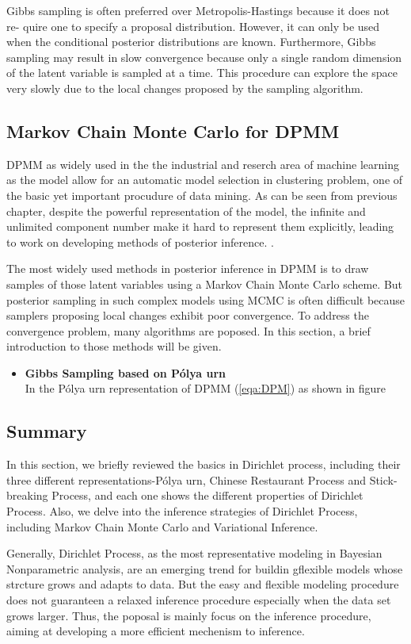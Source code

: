 \begin{itemize}
		 Gibbs sampling is often preferred over Metropolis-Hastings because it does not re-
		 quire one to specify a proposal distribution. However, it can only be used when the
		 conditional posterior distributions are known. Furthermore, Gibbs sampling may result in slow convergence because only a single random dimension of the latent variable is sampled at a time. This procedure can explore the space very slowly due to the local changes proposed by the sampling algorithm.
		 
	\end{itemize}
	
	\subsection{Markov Chain Monte Carlo for DPMM}
	 DPMM as widely used in the the industrial and reserch area of machine learning as the model allow for an automatic model selection in clustering problem, one of the basic yet important procudure of data mining. As can be seen from previous chapter, despite the powerful representation of the model, the infinite and unlimited component number make it hard to represent them explicitly, leading to work on developing methods of posterior inference. . 
	 
	 The most widely used methods in posterior inference in DPMM is to draw samples of those latent variables using a Markov Chain Monte Carlo scheme. But posterior sampling in such complex models using MCMC is often difficult because samplers proposing local changes exhibit poor convergence. To address the convergence problem, many algorithms are poposed. In this section, a brief introduction to those methods will be given.
	 \begin{itemize}
	 	\item \textbf{Gibbs Sampling based on P\'{o}lya urn} \\
	 	In the P\'{o}lya urn representation of DPMM (\ref{eqa:DPM}) as shown in figure
	 \end{itemize}
	\subsection{Summary}
	
	In this section, we briefly reviewed the basics in Dirichlet process, including their three different representations-P\'{o}lya urn, Chinese Restaurant Process and Stick-breaking Process, and each one shows the different properties of Dirichlet Process. Also, we delve into the inference strategies of Dirichlet Process, including Markov Chain Monte Carlo and Variational Inference. 
   
    Generally, Dirichlet Process, as the most representative modeling in Bayesian Nonparametric analysis, are an emerging trend for buildin gflexible models whose strcture grows and adapts to data. But the easy and flexible modeling procedure does not guaranteen a relaxed inference procedure especially when the data set grows larger. Thus, the poposal is mainly focus on the inference procedure, aiming at developing a more efficient mechenism to inference.  
